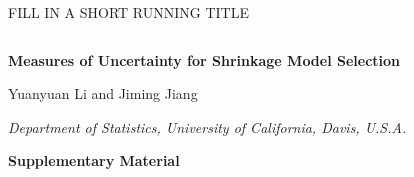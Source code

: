 \documentclass[10pt]{book}
\theoremstyle{definition}
\begin{document}

\renewcommand{\baselinestretch}{2}


{\hfill {\footnotesize\rm FILL IN A SHORT RUNNING TITLE} \hfill}

\renewcommand{\thefootnote}{}
$\ $\par \fontsize{12}{14pt plus.8pt minus .6pt}\selectfont

\def\bSig\mathbf{\Sigma}
\newcommand{\VS}{V\&S}
\newcommand{\tr}{\mbox{tr}}
\newcommand{\argmin}{\mathop{\mathrm{argmin}}\limits}
\newcommand{\argmax}{\mathop{\mathrm{argmax}}\limits}
\newcommand{\dmax}{\mathop{\mathrm{max}}\limits}


 \centerline{\large\bf Measures of Uncertainty for Shrinkage Model Selection}
\vspace{2pt}
\centerline{Yuanyuan Li and Jiming Jiang} 
\vspace{2pt}
 \centerline{\it Department of Statistics, University of California, Davis, U.S.A.}
\vspace{.55cm}
 \centerline{\bf Supplementary Material}
\fontsize{9}{11.5pt plus.8pt minus .6pt}\selectfont
\noindent

\setcounter{section}{0}
\setcounter{equation}{0}
\def\theequation{S\arabic{section}.\arabic{equation}}
\def\thesection{S\arabic{section}}

\fontsize{12}{14pt plus.8pt minus .6pt}\selectfont
\end{document}
